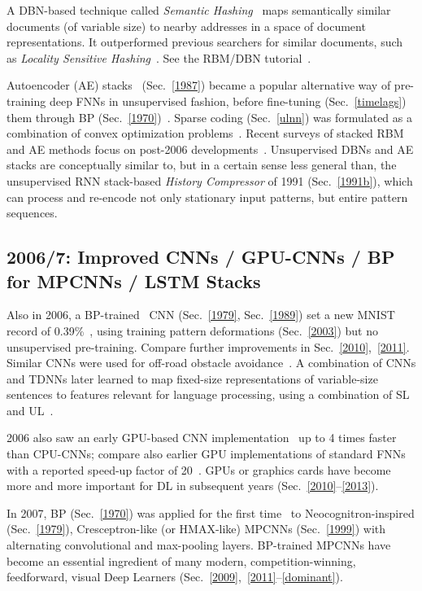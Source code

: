 \documentclass[letterpaper]{article}
\begin{document}
\begin{sloppypar}
A DBN-based technique called
{\em Semantic Hashing}~\citep{salakhutdinov2009}
maps semantically similar documents (of variable size) to nearby addresses in 
a space of document representations. It
outperformed previous searchers for similar documents, 
such as {\em Locality Sensitive Hashing}~\citep{buhler2001,datar2004}.
See the RBM/DBN tutorial~\citep{fischer:13}.


Autoencoder (AE) stacks~\citep{ballard1987modular} (Sec.~\ref{1987}) 
became a popular alternative way of pre-training deep FNNs in 
unsupervised fashion, before fine-tuning (Sec.~\ref{timelags}) them through BP (Sec.~\ref{1970})~\citep{bengio2006,vincent:2008,erhan:10whydoes}. 
Sparse coding (Sec.~\ref{ulnn}) was formulated as 
a combination of convex optimization 
problems~\citep{sparse2007ng}.
Recent surveys of stacked RBM and AE methods focus
on post-2006 developments~\citep{bengio09,itamar2010}.
Unsupervised DBNs and AE stacks are conceptually similar to, but in a certain sense less general than, the
unsupervised RNN stack-based {\em History Compressor}
 of 1991 (Sec.~\ref{1991b}), which can process and re-encode
not only stationary input patterns, but 
entire pattern sequences. 



\subsection{2006/7: Improved CNNs / GPU-CNNs / BP for MPCNNs / LSTM Stacks}
\label{2007}


Also in 2006, a BP-trained~\citep{LeCun:89} CNN (Sec.~\ref{1979}, Sec.~\ref{1989}) 
set a new MNIST record of 0.39\%~\citep{ranzato-06},
using training pattern
deformations (Sec.~\ref{2003}) but no unsupervised pre-training.
Compare further improvements in Sec.~\ref{2010},~\ref{2011}.
Similar CNNs were used for off-road obstacle avoidance~\citep{LeCun:06}.
A combination of CNNs and TDNNs later learned to map fixed-size representations of
variable-size sentences to features
relevant for language processing, 
using a combination of SL and UL~\citep{weston2008}.


2006 also saw an early GPU-based CNN implementation~\citep{chellapilla:2006b} up to 4 times faster
than CPU-CNNs;
compare also earlier GPU implementations of standard FNNs with a reported speed-up factor of 20~\citep{gpu2004}.
GPUs or graphics cards  have become more and more important for DL in 
subsequent years (Sec.~\ref{2010}--\ref{2013}).

In 2007, BP (Sec.~\ref{1970}) was applied for the first time~\citep{ranzato-cvpr-07}  to 
Neocognitron-inspired (Sec.~\ref{1979}),
Cresceptron-like (or HMAX-like) MPCNNs (Sec.~\ref{1999})
with alternating convolutional and max-pooling layers.
BP-trained MPCNNs  have become an 
essential ingredient of many modern, competition-winning, feedforward, visual Deep Learners (Sec.~\ref{2009},~\ref{2011}--\ref{dominant}). 


\end{sloppypar}
\end{document}
